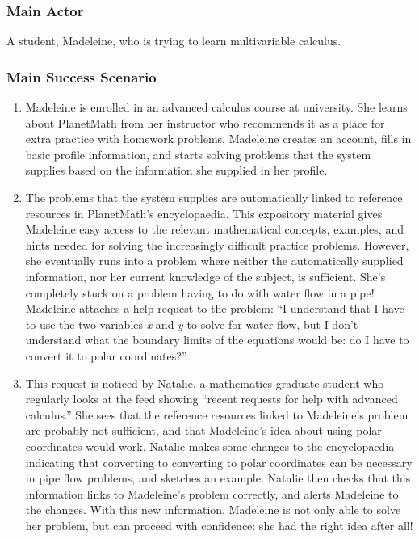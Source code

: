 \subsubsection{Main Actor}

A student, Madeleine, who is trying to learn multivariable calculus.

\subsubsection{Main Success Scenario}

\begin{enumerate}
\item
  Madeleine is enrolled in an advanced calculus course at university.
  She learns about PlanetMath from her instructor who recommends it as a
  place for extra practice with homework problems. Madeleine creates an
  account, fills in basic profile information, and starts solving
  problems that the system supplies based on the information she
  supplied in her profile.
\item
  The problems that the system supplies are automatically linked to
  reference resources in PlanetMath's encyclopaedia. This expository
  material gives Madeleine easy access to the relevant mathematical
  concepts, examples, and hints needed for solving the increasingly
  difficult practice problems. However, she eventually runs into a
  problem where neither the automatically supplied information, nor her
  current knowledge of the subject, is sufficient. She's completely
  stuck on a problem having to do with water flow in a pipe! Madeleine
  attaches a help request to the problem: ``I understand that I have to
  use the two variables \emph{x} and \emph{y} to solve for water flow,
  but I don't understand what the boundary limits of the equations would
  be: do I have to convert it to polar coordinates?''
\item
  This request is noticed by Natalie, a mathematics graduate student who
  regularly looks at the feed showing ``recent requests for help with
  advanced calculus.'' She sees that the reference resources linked to
  Madeleine's problem are probably not sufficient, and that Madeleine's
  idea about using polar coordinates would work. Natalie makes some
  changes to the encyclopaedia indicating that converting to converting
  to polar coordinates can be necessary in pipe flow problems, and
  sketches an example. Natalie then checks that this information links
  to Madeleine's problem correctly, and alerts Madeleine to the changes.
  With this new information, Madeleine is not only able to solve her
  problem, but can proceed with confidence: she had the right idea after
  all!
\end{enumerate}
